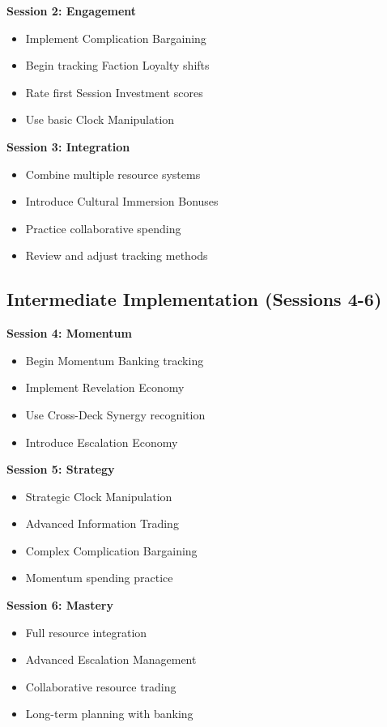 \textbf{Session 2: Engagement}
\begin{itemize}
\item Implement Complication Bargaining
\item Begin tracking Faction Loyalty shifts
\item Rate first Session Investment scores
\item Use basic Clock Manipulation
\end{itemize}

\textbf{Session 3: Integration}
\begin{itemize}
\item Combine multiple resource systems
\item Introduce Cultural Immersion Bonuses
\item Practice collaborative spending
\item Review and adjust tracking methods
\end{itemize}

\subsection{Intermediate Implementation (Sessions 4-6)}

\textbf{Session 4: Momentum}
\begin{itemize}
\item Begin Momentum Banking tracking
\item Implement Revelation Economy
\item Use Cross-Deck Synergy recognition
\item Introduce Escalation Economy
\end{itemize}

\textbf{Session 5: Strategy}
\begin{itemize}
\item Strategic Clock Manipulation
\item Advanced Information Trading
\item Complex Complication Bargaining
\item Momentum spending practice
\end{itemize}

\textbf{Session 6: Mastery}
\begin{itemize}
\item Full resource integration
\item Advanced Escalation Management
\item Collaborative resource trading
\item Long-term planning with banking
\end{itemize}

